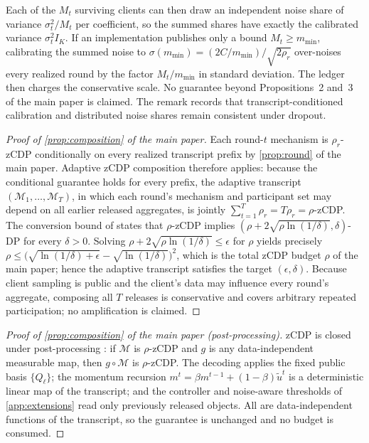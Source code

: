 \documentclass[a4paper,fleqn]{cas-dc}
\begin{document}
Each of the $M_t$ surviving clients can then draw an independent noise share
of variance $\sigma_t^2/M_t$ per coefficient, so the summed shares have
exactly the calibrated variance $\sigma_t^2I_K$. If an implementation
publishes only a bound $M_t\ge m_{\min}$, calibrating the summed noise to
$\sigma(m_{\min})=(2C/m_{\min})/\sqrt{2\rho_r}$ over-noises every realized
round by the factor $M_t/m_{\min}$ in standard deviation. The ledger then
charges the conservative scale. No guarantee beyond
Propositions~2 and~3 of the main paper is claimed. The remark
records that transcript-conditioned calibration and distributed noise shares
remain consistent under dropout.
\begin{proof}[Proof of \cref{prop:composition} of the main paper]
Each round-$t$ mechanism is $\rho_r$-zCDP conditionally on every realized
transcript prefix by \cref{prop:round} of the main paper. Adaptive zCDP composition
\cite{bun2016concentrated} therefore applies: because the conditional
guarantee holds for every prefix, the adaptive transcript
$(\mathcal{M}_1,\dots,\mathcal{M}_T)$, in which each round's mechanism and
participant set may depend on all earlier released aggregates, is jointly
$\sum_{t=1}^T\rho_r=T\rho_r=\rho$-zCDP. The conversion bound of
\cite{bun2016concentrated} states that $\rho$-zCDP implies
$(\rho+2\sqrt{\rho\ln(1/\delta)},\delta)$-DP for every $\delta>0$. Solving
$\rho+2\sqrt{\rho\ln(1/\delta)}\le\epsilon$ for $\rho$ yields precisely
$\rho\le\big(\sqrt{\ln(1/\delta)+\epsilon}-\sqrt{\ln(1/\delta)}\big)^2$,
which is the total zCDP budget $\rho$ of the main paper; hence the adaptive transcript satisfies the
target $(\epsilon,\delta)$. Because client sampling is public and the
client's data may influence every round's aggregate, composing all $T$
releases is conservative and covers arbitrary repeated participation; no
amplification is claimed.
\end{proof}
\begin{proof}[Proof of \cref{prop:composition} of the main paper (post-processing)]
zCDP is closed under post-processing \cite{bun2016concentrated}: if
$\mathcal{M}$ is $\rho$-zCDP and $g$ is any data-independent measurable map,
then $g\circ\mathcal{M}$ is $\rho$-zCDP. The decoding applies the fixed
public basis $\{Q_\ell\}$; the momentum recursion
$m^t=\beta m^{t-1}+(1-\beta)\tilde u^t$ is a deterministic linear map of the
transcript; and the controller and noise-aware thresholds of
\cref{app:extensions} read only previously released objects. All are
data-independent functions of the transcript, so the guarantee is unchanged
and no budget is consumed.
\end{proof}
\end{document}
